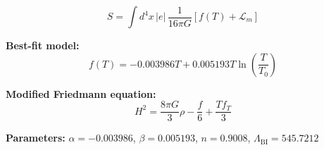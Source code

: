 
\begin{equation}
  S = \int d^4x \, |e| \, \frac{1}{16\pi G} \left[ f(T) + \mathcal{L}_m \right]
\end{equation}

\textbf{Best-fit model:}
\begin{equation}
  f(T) = -0.003986 T + 0.005193 T \ln\!\left(\frac{T}{T_0}\right)
\end{equation}

\textbf{Modified Friedmann equation:}
\begin{equation}
  H^2 = \frac{8\pi G}{3} \rho - \frac{f}{6} + \frac{T f_T}{3}
\end{equation}

\textbf{Parameters:}
$\alpha = -0.003986$, \quad
$\beta = 0.005193$, \quad
$n = 0.9008$, \quad
$\Lambda_{\text{BI}} = 545.7212$